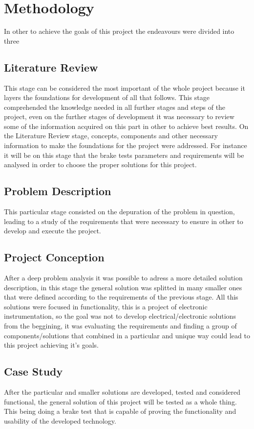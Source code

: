 \chapter{Methodology}\label{ch:methodology}

	In other to achieve the goals of this project the endeavours were divided into three 

	\section{Literature Review}\label{sec:literature-review}
		This stage can be considered the most important of the whole project because it layers the foundations for development of all that follows. This stage comprehended the knowledge needed in all further stages and steps of the project, even on the further stages of development it was necessary to review some of the information acquired on this part in other to achieve best results. On the Literature Review stage, concepts, components and other necessary information to make the foundations for the project were addressed. For instance it will be on this stage that the brake tests parameters and requirements will be analysed in order to choose the proper solutions for this project.

	\section{Problem Description}\label{sec:problem-description}
		This particular stage consisted on the depuration of the problem in question, leading to a study of the requirements that were necessary to ensure in other to develop and execute the project. 

	\section{Project Conception}\label{sec:project-conception}
		After a deep problem analysis it was possible to adress a more detailed solution description, in this stage the general solution was splitted in many smaller ones that were defined according to the requirements of the previous stage. All this solutions were focused in functionality, this is a project of electronic instrumentation, so the goal was not to develop electrical/electronic solutions from the beggining, it was evaluating the requirements and finding a group of components/solutions that combined in a particular and unique way could lead to this project achieving it's goals.
		
	\section{Case Study}\label{sec:case-study}
		After the particular and smaller solutions are developed, tested and considered functional, the general solution of this project will be tested as a whole thing. This being doing a brake test that is capable of proving the functionality and usability of the developed technology.
